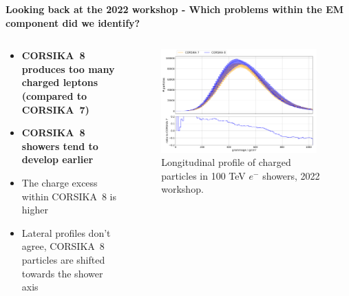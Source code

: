 \documentclass[aspectratio=1610, 9pt]{beamer}
\begin{document}
\begin{frame}

\textbf{Looking back at the 2022 workshop - Which problems within the EM component did we identify?}

    \begin{columns}[onlytextwidth]
        \begin{column}{0.5\textwidth}
            \begin{itemize}
              \item \textbf{CORSIKA~8 produces too many charged leptons (compared to CORSIKA~7)}
              \item \textbf{CORSIKA~8 showers tend to develop earlier}
              \item The charge excess within CORSIKA~8 is higher
              \item Lateral profiles don't agree, CORSIKA~8 particles are shifted towards the shower axis
            \end{itemize}
        \end{column}
        \begin{column}{0.5\textwidth}
            \begin{figure}
                \centering
                \includegraphics[width=0.95\textwidth]{plots/long_charged_2022.png}
                \caption{Longitudinal profile of charged particles in 100 \si{\tera\electronvolt} $e^-$ showers, 2022 workshop.}
            \end{figure}
        \end{column}
    \end{columns}
\end{frame}
\end{document}
